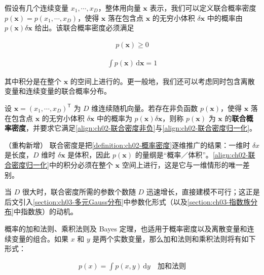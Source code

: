 \documentclass[../../main.tex]{subfiles}
\begin{document}
假设有几个连续变量 $x_1,\cdots,x_D$，整体用向量 $\mathbf{x}$ 表示，我们可以定义联合概率密度 $p(\mathbf{x})=p(x_1,\cdots,x_D)$，使得 $\mathbf{x}$ 落在包含点 $\mathbf{x}$ 的无穷小体积 $\delta\mathbf{x}$ 中的概率由 $p(\mathbf{x})\delta\mathbf{x}$ 给出。该联合概率密度必须满足

\begin{align}
  p(\mathbf{x}) \geqslant 0
  \label{align:ch02-联合密度非负}
\end{align}

\begin{align}
  \int p(\mathbf{x})\,\mathrm{d}\mathbf{x} = 1
  \label{align:ch02-联合密度归一化}
\end{align}

其中积分是在整个 $\mathbf{x}$ 的空间上进行的。更一般地，我们还可以考虑同时包含离散变量和连续变量的联合概率分布。

\begin{definition}[联合概率密度]\label{definition:ch02-联合密度}
设 $\mathbf{x}=(x_1,\cdots,x_D)^{\mathsf{T}}$ 为 $D$ 维连续随机向量。若存在非负函数 $p(\mathbf{x})$，使得 $\mathbf{x}$ 落在包含点 $\mathbf{x}$ 的无穷小体积 $\delta\mathbf{x}$ 中的概率为 $p(\mathbf{x})\delta\mathbf{x}$，则称 $p(\mathbf{x})$ 为 $\mathbf{x}$ 的\textbf{联合概率密度}，并要求它满足\eqref{align:ch02-联合密度非负}与\eqref{align:ch02-联合密度归一化}。
\end{definition}

\begin{remark}（重构新增）
联合密度是把\cref{definition:ch02-概率密度}逐维推广的结果：一维时 $\delta x$ 是长度，$D$ 维时 $\delta\mathbf{x}$ 是体积，因此 $p(\mathbf{x})$ 的量纲是“概率／体积”。\eqref{align:ch02-联合密度归一化}中的积分必须在整个 $\mathbf{x}$ 空间上进行，这是它与一维情形的唯一差别。

当 $D$ 很大时，联合密度所需的参数个数随 $D$ 迅速增长，直接建模不可行；这正是后文引入\cref{section:ch03-多元Gauss分布}中参数化形式（以及\cref{section:ch03-指数族分布}中指数族）的动机。
\end{remark}

概率的加和法则、乘积法则及 Bayes 定理，也适用于概率密度以及离散变量和连续变量的组合。如果 $x$ 和 $y$ 是两个实数变量，那么加和法则和乘积法则将有如下形式：

\begin{align}
  p(x) = \int p(x,y)\,\mathrm{d}y \quad \text{加和法则}
  \label{align:ch02-连续加和法则}
\end{align}
\end{document}
